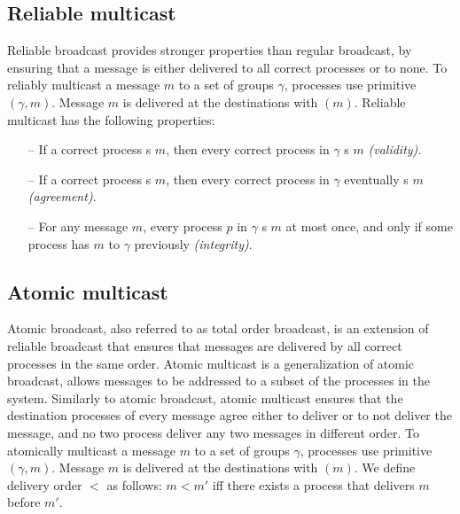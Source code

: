 \subsection{Reliable multicast}
\label{sec:rmcast}

Reliable broadcast provides stronger properties than regular broadcast, by
ensuring that a message is either delivered to all correct processes or to none.
To reliably multicast a message $m$ to a set of groups $\gamma$, processes use
primitive \rmcast$(\gamma, m)$.  Message $m$ is delivered at the destinations
with \rmdel$(m)$.  Reliable multicast has the following properties:

\begin{itemize}

    \item[--] If a correct process \rmcast{}s $m$, then every correct process in
      $\gamma$ \rmdel{}s $m$ \emph{(validity)}.

    \item[--] If a correct process \rmdel{}s $m$, then every correct process in
      $\gamma$ eventually \rmdel{}s $m$ \emph{(agreement)}.

    \item[--] For any message $m$, every process $p$ in $\gamma$ \rmdel{}s $m$
      at most once, and only if some process has \rmcast{} $m$ to $\gamma$
      previously \emph{(integrity)}.

\end{itemize}

\subsection{Atomic multicast}
\label{sec:amcast}
Atomic broadcast, also referred to as total order broadcast, is an extension of
reliable broadcast that ensures that messages are delivered by all correct
processes in the same order. Atomic multicast is a generalization of atomic
broadcast, allows messages to be addressed to a subset of the processes in the
system. Similarly to atomic broadcast, atomic multicast ensures that the
destination processes of every message agree either to deliver or to not deliver
the message, and no two process deliver any two messages in different order. To
atomically multicast a message $m$ to a set of groups $\gamma$, processes use
primitive \amcast$(\gamma, m)$.  Message $m$ is delivered at the destinations
with \amdel$(m)$.  We define delivery order $<$ as follows: $m < m'$ iff there
exists a process that delivers $m$ before $m'$.

